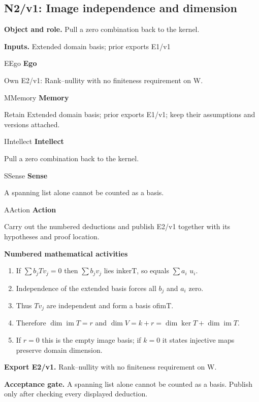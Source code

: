 \documentclass[preprint,12pt,aps,pra,showkeys,amsmath,amssymb,superscriptaddress,floatfix]{revtex4-2}
\theoremstyle{definition}
\theoremstyle{remark}
\newcommand{\mmfaculty}[3]{%
 \begin{mmfacultybox}{#1}{#2}
 {\sffamily\bfseries\color{MMBlue}#2}\par\smallskip #3
 \end{mmfacultybox}}
\newcommand{\field}[2]{\par\smallskip\noindent\textbf{#1.} #2\par}
\begin{document}
\subsection{N2/v1: Image independence and dimension}

\field{Object and role}{Pull a zero combination back to the kernel.}

\field{Inputs}{Extended domain basis; prior exports E1/v1}

\mmfaculty{E}{Ego}{Own E2/v1: Rank--nullity with no finiteness requirement on W.}

\mmfaculty{M}{Memory}{Retain Extended domain basis; prior exports E1/v1; keep their
assumptions and versions attached.}

\mmfaculty{I}{Intellect}{Pull a zero combination back to the kernel.}

\mmfaculty{S}{Sense}{A spanning list alone cannot be counted as a basis.}

\mmfaculty{A}{Action}{Carry out the numbered deductions and publish E2/v1 together with its
hypotheses and proof location.}

\smallskip\noindent\textbf{Numbered mathematical activities}

\begin{enumerate}[label=N2.\arabic*,leftmargin=3.4em]

\item If \(\sum b_jTv_j=0\) then \(\sum b_jv_j\) lies inkerT, so equals
\(\sum a_i\) \(u_i\).

\item Independence of the extended basis forces all \(b_j\) and \(a_i\) zero.

\item Thus \(Tv_j\) are independent and form a basis ofimT.

\item Therefore \(\dim\operatorname{im} T=r\) and
\(\operatorname{dim} V=k+r=\dim\ker T+\dim\operatorname{im} T\).

\item If \(r=0\) this is the empty image basis; if \(k=0\) it states injective
maps preserve domain dimension.

\end{enumerate}

\field{Export E2/v1}{Rank--nullity with no finiteness requirement on W.}

\field{Acceptance gate}{A spanning list alone cannot be counted as a basis. Publish only after
checking every displayed deduction.}
\end{document}
